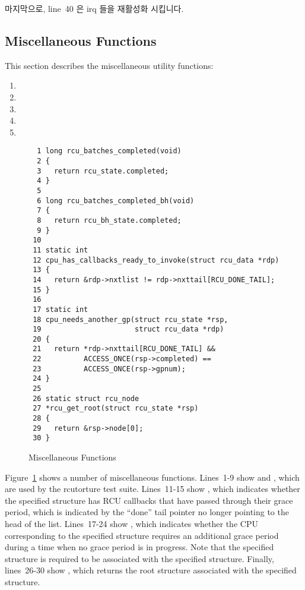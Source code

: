 마지막으로, line~40 은 irq 들을 재활성화 시킵니다.
\iffalse

Finally, line~40 re-enables irqs.
\fi

\subsection{Miscellaneous Functions}
\label{app:rcuimpl:rcutreewt:Miscellaneous Functions}

This section describes the miscellaneous utility functions:
\begin{enumerate}
\item	{}
\item	{}
\item	{}
\item	{}
\item	{}
\end{enumerate}

\begin{figure}[tbp]
{ \scriptsize
\begin{verbatim}
  1 long rcu_batches_completed(void)
  2 {
  3   return rcu_state.completed;
  4 }
  5
  6 long rcu_batches_completed_bh(void)
  7 {
  8   return rcu_bh_state.completed;
  9 }
 10
 11 static int
 12 cpu_has_callbacks_ready_to_invoke(struct rcu_data *rdp)
 13 {
 14   return &rdp->nxtlist != rdp->nxttail[RCU_DONE_TAIL];
 15 }
 16
 17 static int
 18 cpu_needs_another_gp(struct rcu_state *rsp,
 19                      struct rcu_data *rdp)
 20 {
 21   return *rdp->nxttail[RCU_DONE_TAIL] &&
 22          ACCESS_ONCE(rsp->completed) ==
 23          ACCESS_ONCE(rsp->gpnum);
 24 }
 25
 26 static struct rcu_node
 27 *rcu_get_root(struct rcu_state *rsp)
 28 {
 29   return &rsp->node[0];
 30 }
\end{verbatim}
}
\caption{Miscellaneous Functions}
\label{fig:app:rcuimpl:rcutreewt:Miscellaneous Functions}
\end{figure}

Figure~\ref{fig:app:rcuimpl:rcutreewt:Miscellaneous Functions}
shows a number of miscellaneous functions.
Lines~1-9 show  and
, which are used by the rcutorture
test suite.
Lines~11-15 show , which
indicates whether the specified  structure has RCU
callbacks that have passed through their grace period, which
is indicated by the ``done'' tail pointer no longer pointing
to the head of the list.
Lines~17-24 show , which indicates
whether the CPU corresponding to the specified 
structure requires an additional grace period during a time when
no grace period is in progress.
Note that the specified  structure is required
to be associated with the specified  structure.
Finally, lines~26-30 show , which returns
the root  structure associated with the specified
 structure.

